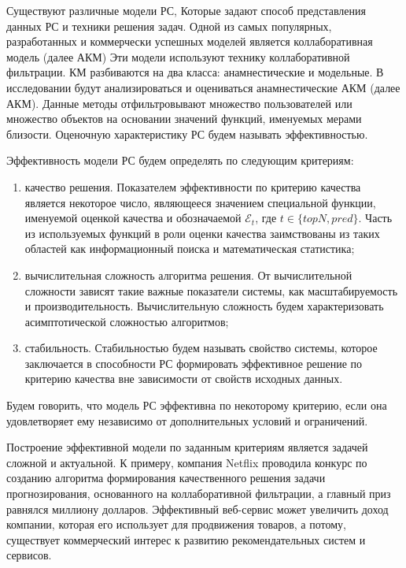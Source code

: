 Существуют различные модели РС, Которые задают способ
представления данных РС и техники решения задач.
Одной из самых
популярных, разработанных и коммерчески успешных моделей
является коллаборативная модель (далее АКМ) \cite{most-researched, rs-in-compsciense}
Эти модели используют технику коллаборативной фильтрации.
КМ разбиваются на два класса: анамнестические и модельные. В исследовании
будут анализироваться и оцениваться анамнестические АКМ (далее АКМ).
Данные методы отфильтровывают множество пользователей или множество объектов
на основании значений функций, именуемых мерами близости.
Оценочную характеристику РС будем
называть эффективностью.

Эффективность модели РС будем определять по следующим критериям:
\begin{enumerate}[label*=\arabic*)]
\item качество решения. Показателем эффективности по критерию качества
	является некоторое число, являющееся значением специальной функции,
	именуемой оценкой качества и обозначаемой $\mathcal{E}_t$, где
	$t \in \{topN, pred\}$.
	Часть из используемых функций в роли оценки качества заимствованы из
	таких областей как информационный поиска и математическая статистика;
\item вычислительная сложность алгоритма решения. От вычислительной сложности
	зависят такие важные показатели системы, как масштабируемость и
	производительность. Вычислительную сложность будем характеризовать
	асимптотической сложностью алгоритмов;
\item стабильность. Стабильностью будем называть свойство системы, которое
	заключается в способности РС формировать эффективное решение по критерию
	качества
	вне зависимости от
	свойств исходных данных.
\end{enumerate}
Будем говорить, что модель РС эффективна по некоторому критерию, если она
удовлетворяет ему независимо от дополнительных условий и ограничений.

Построение эффективной модели по заданным критериям является
задачей сложной и актуальной. К примеру, компания Netflix
проводила конкурс по созданию алгоритма формирования качественного решения
задачи прогнозирования, основанного на коллаборативной фильтрации, а главный
приз равнялся миллиону долларов.
Эффективный веб-сервис может увеличить доход компании,
которая его использует для продвижения товаров, а потому,
существует коммерческий интерес к развитию рекомендательных систем и сервисов.

